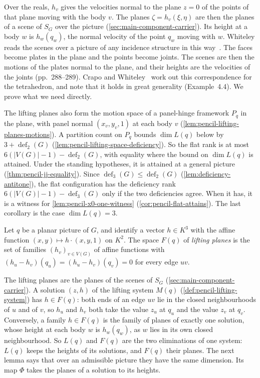Over the reals, $h_v$ gives the velocities normal to the plane $z = 0$ of
the points of that plane moving with the body $v$. The planes
$\zeta = h_v(\xi, \eta)$ are then the planes of a scene of $S_G$ over the
picture (\cref{sec:main-component-carrier}). Its height at a body $w$ is
$h_w(q_w)$, the normal velocity of the point $q_w$ moving with $w$.
Whiteley reads the scenes over a picture of any incidence structure in
this way~\cite[\S 5.3]{whiteley1984}. The faces become plates in the
plane and the points become joints. The scenes are then the motions of
the plates normal to the plane, and their heights are the velocities of
the joints (pp.~288--289). Crapo and
Whiteley~\cite{crapoWhiteley1982} work out this correspondence for the
tetrahedron, and note that it holds in great generality (Example~4.4).
We prove what we need directly.

The lifting planes also form the motion space of a panel-hinge framework
$P_q$ in the plane, with panel normal $(x_v, y_v, 1)$ at each body $v$
(\cref{lem:pencil-lifting-planes-motions}). A partition count on $P_q$
bounds $\dim L(q)$ below by $3 + \operatorname{def}_2(G)$
(\cref{lem:pencil-lifting-space-deficiency}). So the flat rank is at most
$6(|V(G)| - 1) - \operatorname{def}_2(G)$, with equality where the bound
on $\dim L(q)$ is attained. Under the standing hypotheses, it is
attained at a general picture (\cref{thm:pencil-jj-equality}). Since
$\operatorname{def}_3(G) \le \operatorname{def}_2(G)$
(\cref{lem:deficiency-antitone}), the flat
configuration has the deficiency rank
$6(|V(G)| - 1) - \operatorname{def}_3(G)$ only if the two deficiencies
agree. When it has, it is a witness for \cref{lem:pencil-x0-one-witness}
(\cref{cor:pencil-flat-attains}). The last corollary is the case
$\dim L(q) = 3$.

\begin{definition}
  \label{def:pencil-lifting-planes}
  \leanok
  Let $q$ be a planar picture of $G$, and identify a vector
  $h \in K^3$ with the affine function $(x, y) \mapsto h \cdot (x, y, 1)$
  on $K^2$. The space $F(q)$ of \emph{lifting planes} is the set of
  families $(h_v)_{v \in V(G)}$ of affine functions with
  $(h_u - h_v)(q_u) = (h_u - h_v)(q_v) = 0$ for every edge $uv$.
\end{definition}

The lifting planes are the planes of the scenes of $S_G$
(\cref{sec:main-component-carrier}). A solution $(z, h)$ of the lifting
system $M(q)$ (\cref{def:pencil-lifting-system}) has $h \in F(q)$: both
ends of an edge $uv$ lie in the closed neighbourhoods of $u$ and of $v$,
so $h_u$ and $h_v$ both take the value $z_u$ at $q_u$ and the value
$z_v$ at $q_v$. Conversely, a family $h \in F(q)$ is the family of
planes of exactly one solution, whose height at each body $w$ is
$h_w(q_w)$, as $w$ lies in its own closed neighbourhood. So $L(q)$ and
$F(q)$ are the two eliminations of one system: $L(q)$ keeps the heights
of its solutions, and $F(q)$ their planes. The next lemma says that over
an admissible picture they have the same dimension. Its map $\Phi$
takes the planes of a solution to its heights.

